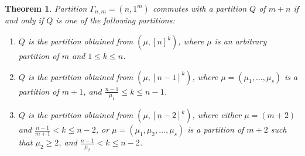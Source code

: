 \documentclass[10pt,a4paper]{amsart}
\newtheorem{thm}{Theorem}
\begin{document}
\begin{thm}\label{all that commute with hook}
    Partition $\Gamma_{n,m} =\left(n,1^m\right)$ commutes with a partition $Q$ of $m+n$ if and only if $Q$ is one of the following partitions:
    \begin{enumerate}
        \item[(a)] $Q$ is the partition obtained from $\left(\mu, [n]^k\right)$, where $\mu$ is an arbitrary partition of $m$ and $1\leq k\leq n$.
        \item[(b)] $Q$ is the partition obtained from $\left(\mu,[n-1]^k\right)$, where $\mu=(\mu_1,\ldots, \mu_s)$ is a partition of $m+1$, and $\frac{n-1}{\mu_1}\leq k\leq n-1$.
        \item[(c)] $Q$ is the partition obtained from $\left(\mu, [n-2]^k\right)$, where either $\mu=(m+2)$ and $\frac{n-1}{m+1}< k \leq n-2$, or $\mu=(\mu_1, \mu_2, \ldots, \mu_s)$ is a partition of $m+2$ such that $\mu_2\geq 2$, and $\frac{n-1}{\mu_2} < k \leq n-2$.
    \end{enumerate}
\end{thm}
\end{document}
